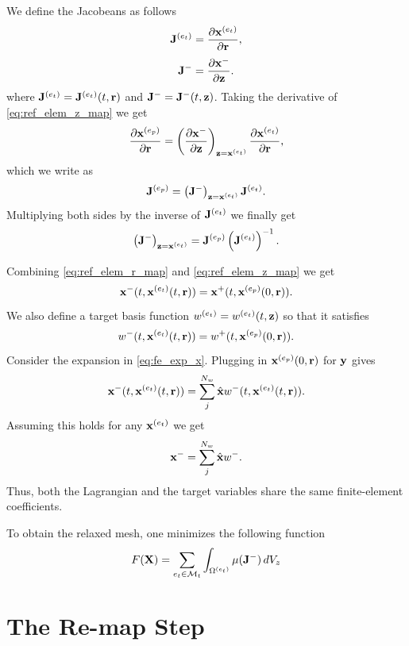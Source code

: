 \documentclass[11pt]{report}
\begin{document}
We define the Jacobeans as follows
\begin{equation}
    \mathbf{J}^{(e_t)} = \frac{\partial \mathbf{x}^{(e_t)}}{\partial \mathbf{r}},
\end{equation}
\begin{equation}
    \mathbf{J}^- = \frac{\partial \mathbf{x}^-}{\partial \mathbf{z}}.
\end{equation}
where $\mathbf{J}^{(e_t)} = \mathbf{J}^{(e_t)}(t,\mathbf{r})$ and $\mathbf{J}^-=\mathbf{J}^-(t,\mathbf{z})$. Taking the derivative of \cref{eq:ref_elem_z_map} we get
\begin{equation}
    \frac{\partial \mathbf{x}^{(e_p)}}{\partial \mathbf{r}} = \left( \frac{ \partial \mathbf{x}^-}{\partial \mathbf{z}} \right)_{\mathbf{z}=\mathbf{x}^{(e_t)}} \frac{ \partial \mathbf{x}^{(e_t)} }{ \partial \mathbf{r}},
\end{equation}
which we write as
\begin{equation}
    \mathbf{J}^{(e_p)} = \left( \mathbf{J}^- \right)_{\mathbf{z}=\mathbf{x}^{(e_t)}} \mathbf{J}^{(e_t)}.
\end{equation}
Multiplying both sides by the inverse of $\mathbf{J}^{(e_t)}$ we finally get
\begin{equation}
    \left( \mathbf{J}^- \right)_{\mathbf{z}=\mathbf{x}^{(e_t)}} = \mathbf{J}^{(e_p)} \left( \mathbf{J}^{(e_t)} \right)^{-1}.
\end{equation}

Combining \cref{eq:ref_elem_r_map} and \cref{eq:ref_elem_z_map} we get
\begin{equation}
    \mathbf{x}^-(t,\mathbf{x}^{(e_t)}(t,\mathbf{r})) = \mathbf{x}^+(t, \mathbf{x}^{(e_p)}(0,\mathbf{r})).
\end{equation}
We also define a target basis function $w^{(e_t)} = w^{(e_t)}(t,\mathbf{z})$ so that it satisfies
\begin{equation}
    w^-(t,\mathbf{x}^{(e_t)}(t,\mathbf{r})) = w^+(t, \mathbf{x}^{(e_p)}(0,\mathbf{r})).
\end{equation}
Consider the expansion in \cref{eq:fe_exp_x}. Plugging in $\mathbf{x}^{(e_p)}(0,\mathbf{r})$ for $\mathbf{y}$ gives
\begin{equation}
    \mathbf{x}^-(t,\mathbf{x}^{(e_t)}(t,\mathbf{r})) = \sum_j^{N_w} \hat{\mathbf{x}} w^-(t,\mathbf{x}^{(e_t)}(t,\mathbf{r})).
\end{equation}
Assuming this holds for any $\mathbf{x}^{(e_t)}$ we get
\begin{equation}
    \mathbf{x}^- = \sum_j^{N_w} \hat{\mathbf{x}} w^-.
\end{equation}
Thus, both the Lagrangian and the target variables share the same finite-element coefficients.

To obtain the relaxed mesh, one minimizes the following function
\begin{equation}
    F(\mathbf{X}) = \sum_{e_t \in \mathcal{M}_t} \int_{\Omega^{(e_t)}} \mu( \mathbf{J}^- ) \, dV_z
\end{equation}

\chapter{The Re-map Step}
\end{document}
